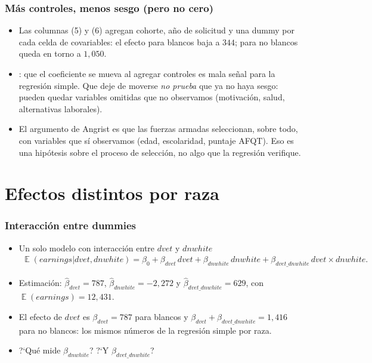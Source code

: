 \documentclass[t, compress, spanish, aspectratio=169]{beamer}
\DeclareMathOperator{\E}{\mathbb{E}}
\newcommand{\term}[1]{\structure{\textbf{#1}}} %
\begin{document}
	\begin{frame}
		\frametitle{M\'as controles, menos sesgo (pero no cero)}
		\small
		\begin{itemize}
			\item Las columnas (5) y (6) agregan cohorte, a\~no de solicitud y una dummy por cada celda de covariables: el efecto para blancos baja a $344$; para no blancos queda en torno a $1,050$.
			\item \term{Un solo sentido}: que el coeficiente se mueva al agregar controles es mala se\~nal para la regresi\'on simple. Que deje de moverse \emph{no prueba} que ya no haya sesgo: pueden quedar variables omitidas que no observamos (motivaci\'on, salud, alternativas laborales).
			\item El argumento de Angrist es que las fuerzas armadas seleccionan, sobre todo, con variables que s\'i observamos (edad, escolaridad, puntaje AFQT). \alert{Eso es una hip\'otesis sobre el proceso de selecci\'on, no algo que la regresi\'on verifique.}
		\end{itemize}
	\end{frame}

	\section{Efectos distintos por raza}

	\begin{frame}
		\frametitle{Interacci\'on entre dummies}
		\small
		\begin{itemize}
			\item Un solo modelo con interacci\'on entre $dvet$ y $dnwhite$
			\begin{align*}
				\E(earnings|dvet,dnwhite)=\beta_0+\beta_{dvet}\,dvet+\beta_{dnwhite}\,dnwhite+\beta_{dvet\_dnwhite}\,dvet \times dnwhite.
			\end{align*}
			\item Estimaci\'on: $\hat\beta_{dvet}=787$, $\hat\beta_{dnwhite}=-2,272$ y $\hat\beta_{dvet\_dnwhite}=629$, con $\E(earnings)=12,431$.
			\item El efecto de $dvet$ es $\beta_{dvet}=787$ para blancos y $\beta_{dvet}+\beta_{dvet\_dnwhite}=1,416$ para no blancos: los mismos n\'umeros de la regresi\'on simple por raza.
			\item ?`Qu\'e mide $\beta_{dnwhite}$? ?`Y $\beta_{dvet\_dnwhite}$?
		\end{itemize}
	\end{frame}
\end{document}
